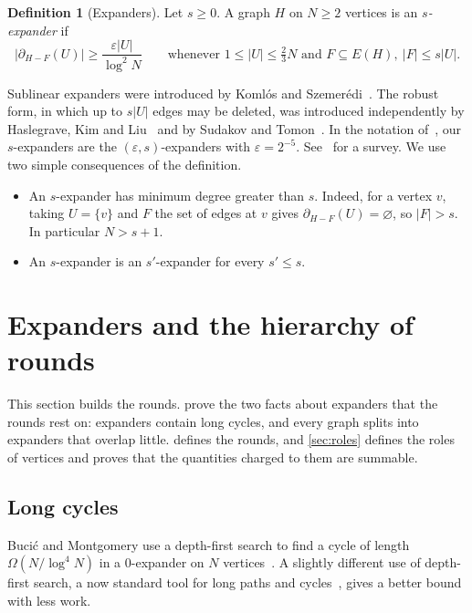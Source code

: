 \documentclass[11pt]{article}
\theoremstyle{definition}
\newtheorem{definition}[theorem]{Definition}
\theoremstyle{remark}
\numberwithin{equation}{section}
\numberwithin{figure}{section}
\numberwithin{table}{section}
\newcommand{\eps}{\varepsilon}
\newcommand{\NN}{\partial}
\begin{document}
\begin{definition}[Expanders]\label{def:expander}
Let $s\ge0$. A graph $H$ on $N\ge2$ vertices is an \emph{$s$-expander} if
\[
|\NN_{H-F}(U)|\ge\frac{\eps|U|}{\log^2N}
\qquad\text{whenever } 1\le|U|\le\tfrac23N\text{ and }F\subseteq E(H),\ |F|\le s|U|.
\]
\end{definition}

Sublinear expanders were introduced by Koml\'os and
Szemer\'edi~\cite{KS1,KS2}. The robust form, in which up to $s|U|$ edges may be
deleted, was introduced independently by Haslegrave, Kim and Liu~\cite{HKL} and
by Sudakov and Tomon~\cite{ST}. In the notation of~\cite[Definition~11]{BM}, our
$s$-expanders are the $(\eps,s)$-expanders with $\eps=2^{-5}$. See~\cite{Let}
for a survey. We use two simple consequences of the definition.
\begin{itemize}[leftmargin=2em,itemsep=1pt]
\item An $s$-expander has minimum degree greater than $s$. Indeed, for a vertex
$v$, taking $U=\{v\}$ and $F$ the set of edges at $v$ gives
$\NN_{H-F}(U)=\varnothing$, so $|F|>s$. In particular $N>s+1$.
\item An $s$-expander is an $s'$-expander for every $s'\le s$.
\end{itemize}

\section{Expanders and the hierarchy of rounds}\label{sec:hierarchy}

This section builds the rounds.  prove the
two facts about expanders that the rounds rest on: expanders contain long
cycles, and every graph splits into expanders that overlap little.
 defines the rounds, and \cref{sec:roles} defines the roles
of vertices and proves that the quantities charged to them are summable.

\subsection{Long cycles}\label{sec:longcycles}

Buci\'c and Montgomery use a depth-first search to find a cycle of length
$\Omega(N/\log^4N)$ in a $0$-expander on $N$ vertices~\cite[Lemma~25]{BM}. A
slightly different use of depth-first search, a now standard tool for long paths
and cycles~\cite{Kri}, gives a better bound with less work.
\end{document}
